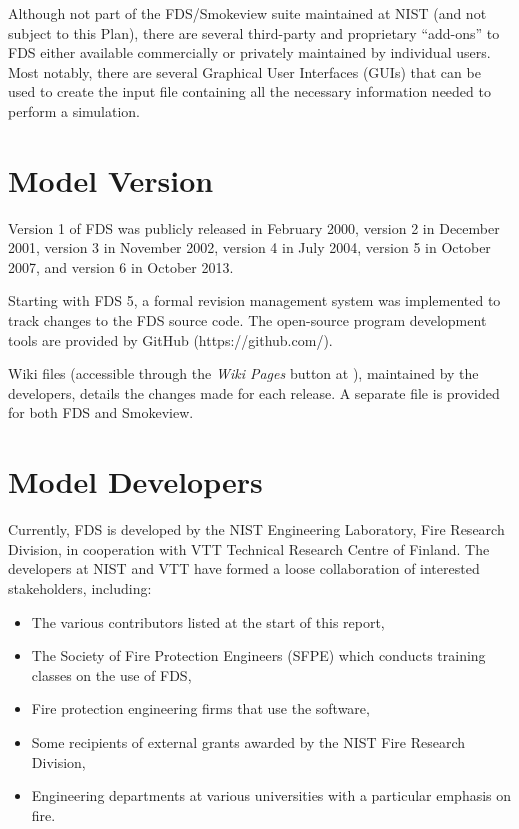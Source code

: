 \documentclass[11pt]{book}
\begin{document}
Although not part of the FDS/Smokeview suite maintained at NIST (and not subject to this Plan), there are several third-party and proprietary ``add-ons'' to FDS either available
commercially or privately maintained by individual users. Most notably, there are several Graphical User Interfaces (GUIs) that can be used to create
the input file containing all the necessary information needed to perform a simulation.



\section{Model Version}

Version 1 of FDS was publicly released in February 2000, version 2 in December 2001, version 3 in November 2002, version 4 in July 2004, version 5 in October 2007, and version 6 in October 2013.

Starting with FDS 5, a formal revision management system was implemented to track changes to the FDS source code. The open-source program development tools are provided by GitHub (https://github.com/).

Wiki files (accessible through the \emph{Wiki Pages} button at \href{https://pages.nist.gov/fds/} {}), maintained by the developers, details the changes made for each release. A separate file is provided for both FDS and Smokeview.


\section{Model Developers}


Currently, FDS is developed by the NIST Engineering Laboratory, Fire Research Division, in cooperation with VTT Technical Research Centre of Finland. The developers at NIST and VTT have formed a loose collaboration of interested stakeholders, including:
\begin{itemize}
\item The various contributors listed at the start of this report,
\item The Society of Fire Protection Engineers (SFPE) which conducts training classes on the use of FDS,
\item Fire protection engineering firms that use the software,
\item Some recipients of external grants awarded by the NIST Fire Research Division,
\item Engineering departments at various universities with a particular emphasis on fire.
\end{itemize}
\end{document}
